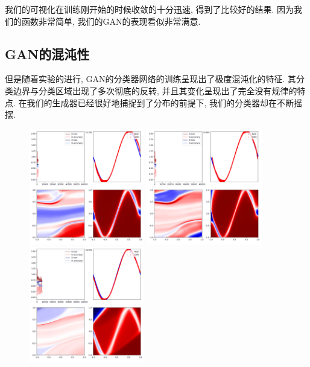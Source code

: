 \documentclass[lang=cn,11pt]{elegantpaper}
\begin{document}
我们的可视化在训练刚开始的时候收敛的十分迅速, 得到了比较好的结果. 因为我们的函数非常简单, 我们的GAN的表现看似非常满意.


\subsection{GAN的混沌性}

但是随着实验的进行, GAN的分类器网络的训练呈现出了极度混沌化的特征. 其分类边界与分类区域出现了多次彻底的反转, 并且其变化呈现出了完全没有规律的特点. 在我们的生成器已经很好地捕捉到了分布的前提下, 我们的分类器却在不断摇摆.

\begin{figure}[hbt]
\centering
  \includegraphics[width=0.45\textwidth]{sin_3_1}
  \includegraphics[width=0.45\textwidth]{sin_3_2}\\
  \includegraphics[width=0.45\textwidth]{sin_3_3}

\end{figure}
\end{document}

